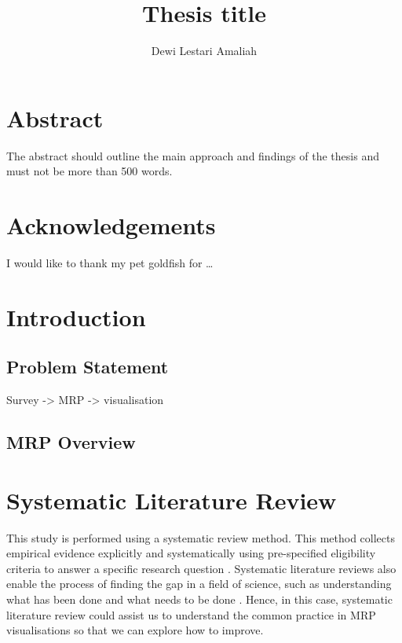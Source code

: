 \documentclass{monashthesis}
\author{Dewi Lestari Amaliah}
\title{Thesis title}
\begin{document}

\titlepage

{\sf\tighttoc\doublespacing}

\clearpage{}\setcounter{page}{0}

\hypertarget{abstract}{%
\chapter*{Abstract}\label{abstract}}

The abstract should outline the main approach and findings of the thesis and must not be more than 500 words.

\newpage

\hypertarget{acknowledgements}{%
\chapter*{Acknowledgements}\label{acknowledgements}}

I would like to thank my pet goldfish for \dots

\hypertarget{ch:intro}{%
\chapter{Introduction}\label{ch:intro}}

\hypertarget{problem-statement}{%
\section{Problem Statement}\label{problem-statement}}

Survey -\textgreater{} MRP -\textgreater{} visualisation

\hypertarget{mrp-overview}{%
\section{MRP Overview}\label{mrp-overview}}

\hypertarget{sec:syslitrev}{%
\chapter{Systematic Literature Review}\label{sec:syslitrev}}

This study is performed using a systematic review method. This method collects empirical evidence explicitly and systematically using pre-specified eligibility criteria to answer a specific research question \autocite{cochrane}. Systematic literature reviews also enable the process of finding the gap in a field of science, such as understanding what has been done and what needs to be done \autocite{LinnenlueckeMartinaK2020Cslr}. Hence, in this case, systematic literature review could assist us to understand the common practice in MRP visualisations so that we can explore how to improve.
\end{document}
